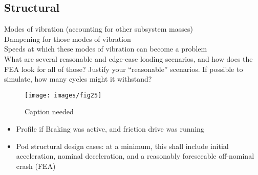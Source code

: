 \documentclass[main.tex]{subfile}
\begin{document}
    \subsection{Structural}
    Modes of vibration (accounting for other subsystem masses)\\
    Dampening for those modes of vibration\\
    Speeds at which these modes of vibration can become a problem\\
    What are several reasonable and edge-case loading scenarios, and how does the FEA look for all of those? Justify your “reasonable” scenarios. If possible to simulate, how many cycles might it withstand?
    \begin{figure}[H]
        \centering
        \texttt{[image: images/fig25]}
        \caption{Caption needed}
    \end{figure}
    \begin{itemize}
        \item Profile if Braking was active, and friction drive was running
        \item Pod structural design cases: at a minimum, this shall include initial acceleration, nominal deceleration, and a reasonably foreseeable off-nominal crash (FEA)
    \end{itemize}
\end{document}

